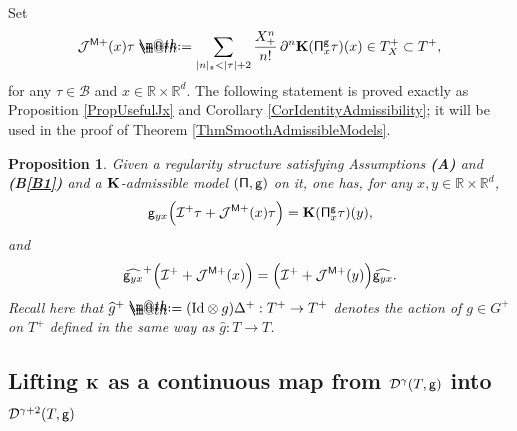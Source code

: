 \documentclass[10pt, reqno]{amsart}
\makeatletter
\numberwithin{subsection}{section}
\numberwithin{subsubsection}{subsection}
\numberwithin{equation}{section} %
\theoremstyle{mystyle}
\newtheorem{prop}[thm]{\hspace{-0.13cm} {Proposition}}%
\theoremstyle{mystyle2}
\theoremstyle{mystyle3}
\newcommand{\REFA}{\textbf{\textsf{(A)}}}
\newcommand{\refB}[1]{\textbf{\textsf{(B\ref{#1})}}}
\newcommand{\iden}{\text{\rm Id}}
\newcommand\bbR{\mathbb{R}}
\newcommand{\mcB}{\mathcal{B}}
\newcommand{\mcD}{\mathcal{D}}
\newcommand{\mcI}{\mathcal{I}}
\newcommand{\mcJ}{\mathcal{J}}
\newcommand{\Xplus}{X_+}
\newcommand*{\defeq}{\mathrel{\rlap{%
                     \raisebox{0.3ex}{$\m@th\cdot$}}%
                     \raisebox{-0.3ex}{$\m@th\cdot$}}%
                     =}
\makeatother
\begin{document}
\medskip

Set 
$$
\mcJ^{\sf M+}(x)\tau \defeq  \sum_{|n|_\frak{s}<|\tau|+2} \frac{\Xplus^n}{n!} \,\partial^n {\bf K}({\sf\Pi}^{\sf g}_x\tau)(x) \in T_X^+\subset T^+,
$$
for any $\tau\in\mcB$ and $x\in\bbR\times\bbR^d$. The following statement 
is proved exactly as Proposition \ref{PropUsefulJx} and Corollary \ref{CorIdentityAdmissibility}; it will be used in the proof of Theorem \ref{ThmSmoothAdmissibleModels}.   

\medskip

\begin{prop} \label{PropCommutationRelationPlus}
Given a regularity structure satisfying Assumptions {\REFA} and \refB{B1} and a $\bf K$-admissible model $({\sf\Pi},{\sf g})$ on it, one has, for any $x,y\in\bbR\times\bbR^d$,
$$
{\sf g}_{yx} \Big(\mcI^+\tau + \mcJ^{\sf M+}(x)\tau\Big) = {\bf K}({\sf \Pi}^{\sf g}_x\tau)(y),
$$
and  
\begin{equation}
\label{EqCommutationRelationPlus}
\widehat{{\sf g}_{yx}}^+\Big(\mcI^+ + \mcJ^{\sf M+}(x)\Big) = \Big(\mcI^+ + \mcJ^{\sf M+}(y)\Big)\widehat{{\sf g}_{yx}}.
\end{equation}
Recall here that $\widehat{g}^+\defeq (\iden\otimes g)\Delta^+:T^+\to T^+$ denotes the action of $g\in G^+$ on $T^+$ defined in the same way as $\widehat{g}:T\to T$.
\end{prop}



\bigskip



\subsection{Lifting ${\bf K}$ as a continuous map from $\mcD^\gamma(T,\sf 
g)$ into $\mcD^{\gamma+2}(T,\sf g)$}
\label{SubsectionLiftingK}
\end{document}
